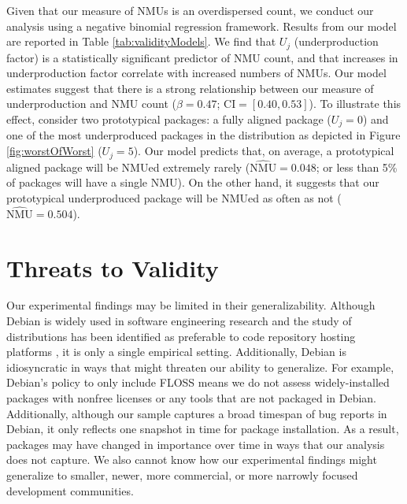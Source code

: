 \documentclass[10pt,conference]{IEEEtran}\usepackage[]{graphicx}\usepackage[usenames,dvipsnames]{color}
\begin{document}
Given that our measure of NMUs is an overdispersed count, we conduct our analysis using a negative binomial regression framework. 
Results from our model are reported in Table \ref{tab:validityModels}.  
We find that $U_j$ (underproduction factor) is a statistically significant predictor of NMU count, and that increases in underproduction factor correlate with increased numbers of NMUs.  
Our model estimates suggest that there is a strong relationship between our measure of underproduction and NMU count ($\beta=0.47$; $\mathrm{CI}=[0.40, 0.53]$).
To illustrate this effect, consider two prototypical packages: a fully aligned package ($U_j=0$) and one of the most underproduced packages in the distribution as depicted in Figure \ref{fig:worstOfWorst} ($U_j=5$). Our model predicts that, on average, a prototypical aligned package will be NMUed extremely rarely ($\widehat{\mathrm{NMU}}=0.048$; or less than 5\% of packages will have a single NMU). On the other hand, it suggests that our prototypical underproduced package will be NMUed as often as not ($\widehat{\mathrm{NMU}}=0.504$).

\section{Threats to Validity}
\label{sec:limitations}

Our experimental findings may be limited in their generalizability. Although Debian is widely used in software engineering research and the study of distributions has been identified as preferable to code repository hosting platforms 
\cite{spaeth_sampling_2007}, it is only a single empirical setting.
Additionally, Debian is idiosyncratic in ways that might threaten our ability to generalize. For example, Debian's policy to only include FLOSS means we do not assess widely-installed packages with nonfree licenses or any tools that are not packaged in Debian.
Additionally, although our sample captures a broad timespan of bug reports in Debian, it only reflects one snapshot in time for package installation. 
As a result, packages may have changed in importance over time in ways that our analysis does not capture.
We also cannot know how our experimental findings might generalize to smaller, newer, more commercial, or more narrowly focused development communities. 
\end{document}
